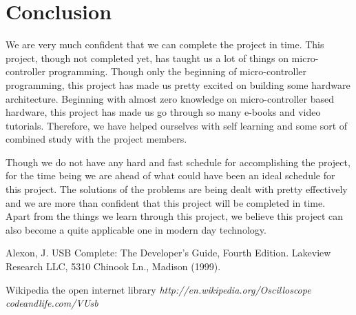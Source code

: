 \documentclass[11pt,a4paper]{article}
\begin{document}
\section{Conclusion}
We are very much confident that we can complete the project in time. This project, though not completed yet, has taught us a lot of things on micro-controller programming. Though only the beginning of micro-controller programming, this project has made us pretty excited on building some hardware architecture. Beginning with almost zero knowledge on micro-controller based hardware, this project has made us go through so many e-books and video tutorials. Therefore, we have helped ourselves with self learning and some sort of combined study with the project members.


Though we do not have any hard and fast schedule for accomplishing the project, for the time being we are ahead of what could have been an ideal schedule for this project. The solutions of the problems are being dealt with pretty effectively and we are more than confident that this project will be completed in time.
Apart from the things we learn through this project, we believe this project can also become a quite applicable one in modern day technology. 

\begin{thebibliography}{99}
\bibitem{} Alexon, J. USB Complete: The Developer’s Guide, Fourth Edition. Lakeview Research LLC, 5310 Chinook Ln., Madison  (1999).

\bibitem{} Wikipedia the open internet library \emph{http://en.wikipedia.org/Oscilloscope}
\bibitem{} \emph{codeandlife.com/VUsb}

\end{thebibliography}
\end{document}
